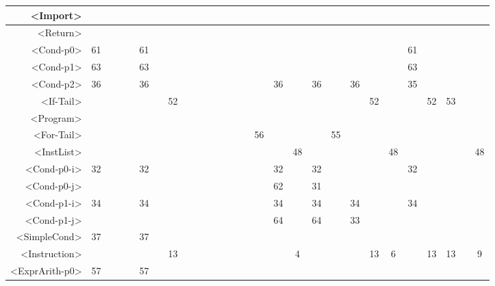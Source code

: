\begin{tabular}{r|c@{ }c@{ }c@{ }c@{ }c@{ }c@{ }c@{ }c@{ }c@{ }c@{ }c@{ }c@{ }c@{ }c@{ }c@{ }c@{ }c@{ }c@{ }c@{ }c@{ }c@{ }c@{ }c@{ }c@{ }c@{ }c@{ }c@{ }}
<Import> &   &   &   &   &   &   &   &   &   &   &   &   &   &   &   &   &   &   &   &   &   &   &   &   &   &   &   \\\hline
<Return> &   &   &   &   &   &   &   &   &   &   &   &   &   &   &   &   &   &   &   &   &   &   &   &   &   &   &   \\\hline
<Cond-p0> & 61 &   &   &   & 61 &   &   &   &   &   &   &   &   &   &   &   &   &   &   &   &   &   & 61 &   &   &   &   \\\hline
<Cond-p1> & 63 &   &   &   & 63 &   &   &   &   &   &   &   &   &   &   &   &   &   &   &   &   &   & 63 &   &   &   &   \\\hline
<Cond-p2> & 36 &   &   &   & 36 &   &   &   &   &   &   &   &   &   &   & 36 &   & 36 &   & 36 &   &   & 35 &   &   &   &   \\\hline
<If-Tail> &   &   &   &   &   &   & 52 &   &   &   &   &   &   &   &   &   &   &   &   &   & 52 &   &   & 52 & 53 &   &   \\\hline
<Program> &   &   &   &   &   &   &   &   &   &   &   &   &   &   &   &   &   &   &   &   &   &   &   &   &   &   &   \\\hline
<For-Tail> &   &   &   &   &   &   &   &   &   &   &   &   &   &   & 56 &   &   &   & 55 &   &   &   &   &   &   &   &   \\\hline
<InstList> &   &   &   &   &   &   &   &   &   &   &   &   &   &   &   &   & 48 &   &   &   &   & 48 &   &   &   &   & 48 \\\hline
<Cond-p0-i> & 32 &   &   &   & 32 &   &   &   &   &   &   &   &   &   &   & 32 &   & 32 &   &   &   &   & 32 &   &   &   &   \\\hline
<Cond-p0-j> &   &   &   &   &   &   &   &   &   &   &   &   &   &   &   & 62 &   & 31 &   &   &   &   &   &   &   &   &   \\\hline
<Cond-p1-i> & 34 &   &   &   & 34 &   &   &   &   &   &   &   &   &   &   & 34 &   & 34 &   & 34 &   &   & 34 &   &   &   &   \\\hline
<Cond-p1-j> &   &   &   &   &   &   &   &   &   &   &   &   &   &   &   & 64 &   & 64 &   & 33 &   &   &   &   &   &   &   \\\hline
<SimpleCond> & 37 &   &   &   & 37 &   &   &   &   &   &   &   &   &   &   &   &   &   &   &   &   &   &   &   &   &   &   \\\hline
<Instruction> &   &   &   &   &   &   & 13 &   &   &   &   &   &   &   &   &   & 4 &   &   &   & 13 & 6 &   & 13 & 13 &   & 9 \\\hline
<ExprArith-p0> & 57 &   &   &   & 57 &   &   &   &   &   &   &   &   &   &   &   &   &   &   &   &   &   &   &   &   &   &   \\\hline

\end{tabular}
